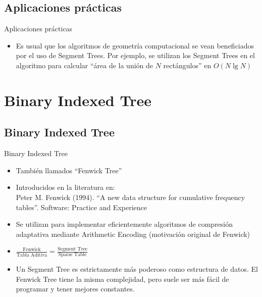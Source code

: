 \documentclass{beamer}
\begin{document}
\subsection{Aplicaciones prácticas}

\begin{frame}{Aplicaciones prácticas}
    \begin{itemize}
         \item Es usual que los algoritmos de geometría computacional se vean beneficiados por el uso de Segment Trees. Por ejemplo,
                se utilizan los Segment Trees en el algoritmo para calcular ``área de la unión de $N$ rectángulos'' en $O(N \lg N)$
    \end{itemize}
\end{frame}

\section{Binary Indexed Tree} %

\subsection{Binary Indexed Tree} %

\begin{frame}{Binary Indexed Tree}
  \begin{itemize}
    \item También llamados ``Fenwick Tree''
    \item Introducidos en la literatura en: \\
            Peter M. Fenwick (1994). ``A new data structure for cumulative frequency tables''. Software: Practice and Experience
    \item Se utilizan para implementar eficientemente algoritmos de compresión adaptativa mediante Arithmetic Encoding (motivación original de Fenwick)
    \item $\frac{\mbox{Fenwick}}{\mbox{Tabla Aditiva}} = \frac{\mbox{Segment Tree}}{\mbox{Sparse Table}}$ 
    \item Un Segment Tree es estrictamente más poderoso como estructura de datos. El Fenwick Tree tiene la misma complejidad, pero suele ser más fácil
           de programar y tener mejores constantes.
  \end{itemize}
\end{frame}
\end{document}
